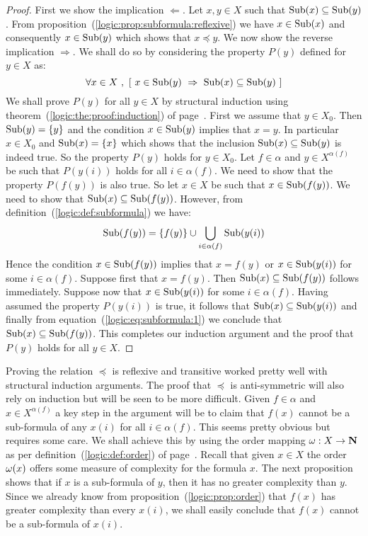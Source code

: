 \begin{proof}
First we show the implication $\Leftarrow$. Let $x,y\in X$ such that
$\mbox{\rm Sub}(x)\subseteq\mbox{\rm Sub}(y)$. From
proposition~(\ref{logic:prop:subformula:reflexive}) we have
$x\in\mbox{\rm Sub}(x)$ and consequently $x\in\mbox{\rm Sub}(y)$ which shows that
$x\preceq y$. We now show the reverse implication $\Rightarrow$. We
shall do so by considering the property $P(y)$ defined for $y\in X$
as:
    \[
    \forall x\in X\ ,\ [\ x\in\subf(y)\ \Rightarrow\
    \subf(x)\subseteq\subf(y)\ ]
    \]
We shall prove $P(y)$ for all $y\in X$ by structural induction using
theorem~(\ref{logic:the:proof:induction}) of
page~\pageref{logic:the:proof:induction}. First we assume that $y\in
X_{0}$. Then $\mbox{\rm Sub}(y) = \{y\}$ and the condition $x\in\mbox{\rm Sub}(y)$
implies that $x=y$. In particular $x\in X_{0}$ and $\mbox{\rm Sub}(x)=\{x\}$
which shows that the inclusion $\mbox{\rm Sub}(x)\subseteq\mbox{\rm Sub}(y)$ is indeed
true. So the property $P(y)$ holds for $y\in X_{0}$. Let
$f\in\alpha$ and $y\in X^{\alpha(f)}$ be such that $P(y(i))$ holds
for all $i\in\alpha(f)$. We need to show that the property $P(f(y))$
is also true. So let $x\in X$ be such that $x\in\mbox{\rm Sub}(f(y))$. We
need to show that $\mbox{\rm Sub}(x)\subseteq\mbox{\rm Sub}(f(y))$. However, from
definition~(\ref{logic:def:subformula}) we have:
    \begin{equation}\label{logic:eq:subformula:1}
    \mbox{\rm Sub}(f(y)) =
    \{f(y)\}\cup\bigcup_{i\in\alpha(f)}\mbox{\rm Sub}(y(i))
    \end{equation}
Hence the condition $x\in\mbox{\rm Sub}(f(y))$ implies that $x=f(y)$ or
$x\in\mbox{\rm Sub}(y(i))$ for some $i\in\alpha(f)$. Suppose first that
$x=f(y)$. Then $\mbox{\rm Sub}(x)\subseteq\mbox{\rm Sub}(f(y))$ follows immediately.
Suppose now that $x\in\mbox{\rm Sub}(y(i))$ for some $i\in\alpha(f)$. Having
assumed the property $P(y(i))$ is true, it follows that
$\mbox{\rm Sub}(x)\subseteq\mbox{\rm Sub}(y(i))$ and finally from
equation~(\ref{logic:eq:subformula:1}) we conclude that
$\mbox{\rm Sub}(x)\subseteq\mbox{\rm Sub}(f(y))$. This completes our induction
argument and the proof that $P(y)$ holds for all $y\in X$.
\end{proof}

Proving the relation $\preceq$ is reflexive and transitive worked
pretty well with structural induction arguments. The proof that
$\preceq$ is anti-symmetric will also rely on induction but will be
seen to be more difficult. Given $f\in\alpha$ and $x\in
X^{\alpha(f)}$ a key step in the argument will be to claim that
$f(x)$ cannot be a sub-formula of any $x(i)$ for all
$i\in\alpha(f)$. This seems pretty obvious but requires some care.
We shall achieve this by using the order mapping $\mbox{$\omega$}:X\to\mbox{$\bf N$}$ as per
definition~(\ref{logic:def:order}) of
page~\pageref{logic:def:order}. Recall that given $x\in X$ the order
$\mbox{$\omega$}(x)$ offers some measure of complexity for the formula $x$. The
next proposition shows that if $x$ is a sub-formula of $y$, then it
has no greater complexity than $y$. Since we already know from
proposition~(\ref{logic:prop:order}) that $f(x)$ has greater
complexity than every $x(i)$, we shall easily conclude that $f(x)$
cannot be a sub-formula of $x(i)$.

